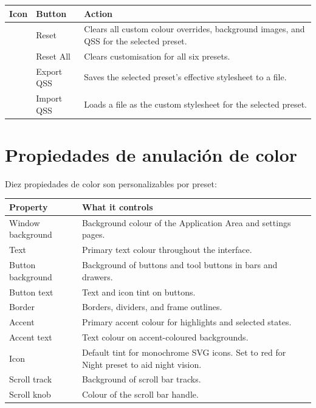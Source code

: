 \begin{longtable}{C{1.5cm}L{3.0cm}L{9.2cm}}
\toprule
{}
\color{white}\sffamily\bfseries Icon &
\color{white}\sffamily\bfseries Button &
\color{white}\sffamily\bfseries Action \\
\midrule
{}     & Reset       &
  Clears all custom colour overrides, background images, and QSS for the selected preset. \\
    & Reset All   &
  Clears customisation for all six presets. \\
 & Export QSS  &
  Saves the selected preset's effective stylesheet to a  file. \\
 & Import QSS  &
  Loads a  file as the custom stylesheet for the selected preset. \\
\bottomrule
\end{longtable}

\section{Propiedades de anulación de color}

Diez propiedades de color son personalizables por preset:

\begin{longtable}{L{3.6cm}L{10.1cm}}
\toprule
{}
\color{white}\sffamily\bfseries Property &
\color{white}\sffamily\bfseries What it controls \\
\midrule
Window background  & Background colour of the Application Area and settings pages. \\
Text               & Primary text colour throughout the interface. \\
Button background  & Background of buttons and tool buttons in bars and drawers. \\
Button text        & Text and icon tint on buttons. \\
Border             & Borders, dividers, and frame outlines. \\
Accent             & Primary accent colour for highlights and selected states. \\
Accent text        & Text colour on accent-coloured backgrounds. \\
Icon               & Default tint for monochrome SVG icons. Set to red for Night preset to aid night vision. \\
Scroll track       & Background of scroll bar tracks. \\
Scroll knob        & Colour of the scroll bar handle. \\
\bottomrule
\end{longtable}

